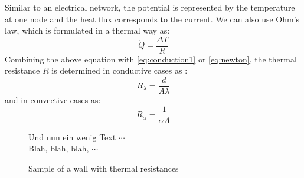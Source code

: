     Similar to an electrical network, the potential is represented by the temperature at one node and the heat flux corresponds to the current. We can also use Ohm's law, which is formulated in a thermal way as:  
     \begin{equation}
    \label{eq:Ohm}
        \dot{Q} = \frac{\Delta T}{R} 
    \end{equation}
    Combining the above equation with \autoref{eq:conduction1} or \autoref{eq:newton}, the thermal resistance $R$ is determined in conductive cases as \cite{Kuchling.2007}:
    \begin{equation}
    \label{eq:r_lambda}
        R_\lambda = \frac{d}{A\lambda}
    \end{equation}
   and in convective cases as\cite{Griesinger.2019}:
    \begin{equation}
        R_\alpha = \frac{1}{\alpha A}
    \end{equation}
    
    \begin{figure}[htbp]
    \begin{minipage}[t]{6cm}
    \vspace{0pt}
    \centering
    
    \caption{Sample of a wall with thermal resistances}
    \label{fig:sampleWall}
    \end{minipage}
    \hfill
    \begin{minipage}[t]{6cm}
    \vspace{0pt}
    Und nun ein wenig Text $\cdots$ \\
    Blah, blah, blah, $\cdots$
    \end{minipage}
    \end{figure}

